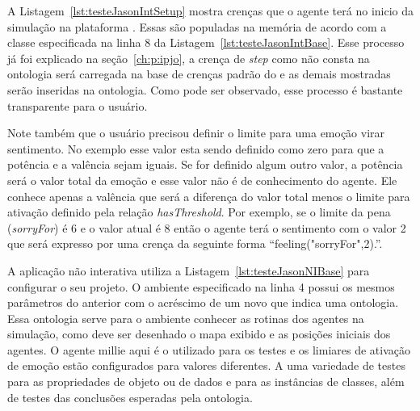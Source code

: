 A Listagem~\ref{lst:testeJasonIntSetup} mostra crenças que o agente terá
no inicio da simulação na plataforma \jason. Essas são populadas na memória
de acordo com a classe especificada na linha 8 da
Listagem~\ref{lst:testeJasonIntBase}. Esse processo já foi explicado na
seção~\ref{ch:p:ipjo}, a crença de \emph{step} como não
consta na ontologia será carregada na base de crenças padrão do \jason e as
demais mostradas serão inseridas na ontologia. Como pode ser observado, esse
processo é bastante transparente para o usuário.

Note também que o usuário precisou definir o limite para uma emoção virar
sentimento. No exemplo esse valor esta sendo definido como zero para que a
potência e a valência sejam iguais. Se for definido algum outro valor, a
potência será o valor total da emoção e esse valor não é de conhecimento do
agente. Ele conhece apenas a valência que será a diferença do valor total
menos o limite para ativação definido pela relação \emph{hasThreshold}. Por
exemplo, se o limite da pena (\emph{sorryFor}) é 6 e o valor atual é 8 então o
agente terá o sentimento com o valor 2 que será expresso por uma crença da
seguinte forma ``feeling("sorryFor",2).''.


\begin{center}
    \begin{minipage}{140mm}
	\lstset{linewidth=140mm}
	
    \end{minipage}
\end{center}

A aplicação não interativa utiliza a Listagem~\ref{lst:testeJasonNIBase} para
configurar o seu projeto. O ambiente especificado na linha 4 possui os mesmos
parâmetros do anterior com o acréscimo de um novo que indica uma ontologia.
Essa ontologia serve para o ambiente conhecer as rotinas dos agentes na
simulação, como deve ser desenhado o mapa exibido e as posições iniciais dos
agentes. O agente millie aqui é o utilizado para os testes e os limiares de
ativação de emoção estão configurados para valores diferentes. A uma
variedade de testes para as propriedades de objeto ou de dados e para as
instâncias de classes, além de testes das conclusões esperadas pela ontologia.



